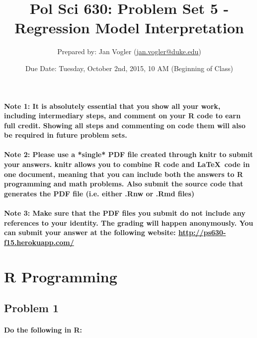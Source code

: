 \documentclass[12pt]{article}
\begin{document}
\title{Pol Sci 630: Problem Set 5 - Regression Model Interpretation}

\author{Prepared by: Jan Vogler (\href{mailto:jan.vogler@duke.edu}{jan.vogler@duke.edu})}

\date{Due Date: Tuesday, October 2nd, 2015, 10 AM (Beginning of Class)}
 
\maketitle 



\paragraph{Note 1: It is absolutely essential that you show all your work, including intermediary steps, and comment on your R code to earn full credit. Showing all steps and commenting on code them will also be required in future problem sets.}

\paragraph{Note 2: Please use a *single* PDF file created through knitr to submit your answers. knitr allows you to combine R code and \LaTeX \ code in one document, meaning that you can include both the answers to R programming and math problems. Also submit the source code that generates the PDF file (i.e. either .Rnw or .Rmd files)}

\paragraph{Note 3: Make sure that the PDF files you submit do not include any references to your identity. The grading will happen anonymously. You can submit your answer at the following website: \url{http://ps630-f15.herokuapp.com/}}



\section*{R Programming}

\subsection*{Problem 1}

\paragraph{Do the following in R:}
\end{document}
